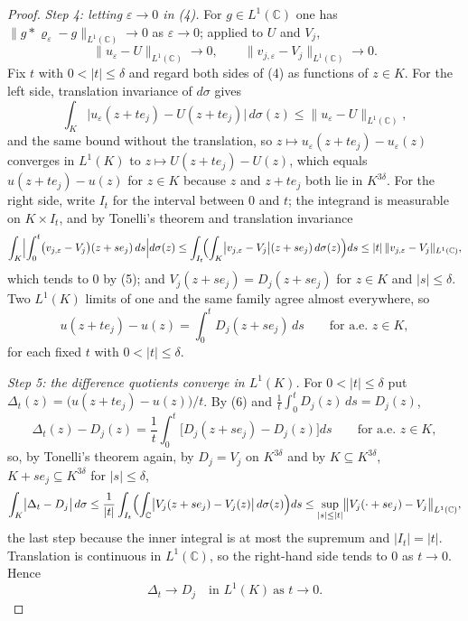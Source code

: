 \begin{proof}
\emph{Step 4: letting $\varepsilon\to0$ in (4).}  For $g\in L^{1}(\mathbb{C})$
one has $\|g*\varrho_\varepsilon-g\|_{L^{1}(\mathbb{C})}\to0$ as
$\varepsilon\to0$; applied to $U$ and $V_j$,
\begin{equation}\tag{5}
  \|u_\varepsilon-U\|_{L^{1}(\mathbb{C})}\to0,\qquad
  \|v_{j,\varepsilon}-V_j\|_{L^{1}(\mathbb{C})}\to0 .
\end{equation}
Fix $t$ with $0<|t|\le\delta$ and regard both sides of (4) as functions of
$z\in K$.  For the left side, translation invariance of $d\sigma$ gives
\[
  \int_K\bigl|u_\varepsilon(z+te_j)-U(z+te_j)\bigr|\,d\sigma(z)
  \le\|u_\varepsilon-U\|_{L^{1}(\mathbb{C})},
\]
and the same bound without the translation, so
$z\mapsto u_\varepsilon(z+te_j)-u_\varepsilon(z)$ converges in $L^{1}(K)$ to
$z\mapsto U(z+te_j)-U(z)$, which equals $u(z+te_j)-u(z)$ for $z\in K$ because
$z$ and $z+te_j$ both lie in $K^{3\delta}$.  For the right side, write $I_t$
for the interval between $0$ and $t$; the integrand is measurable on
$K\times I_t$, and by Tonelli's theorem and translation invariance
\[
  \int_K\Bigl|\int_0^t\bigl(v_{j,\varepsilon}-V_j\bigr)(z+se_j)\,ds\Bigr|
    d\sigma(z)
  \le\int_{I_t}\!\Bigl(\int_K\bigl|v_{j,\varepsilon}-V_j\bigr|(z+se_j)
    \,d\sigma(z)\Bigr)ds
  \le|t|\,\|v_{j,\varepsilon}-V_j\|_{L^{1}(\mathbb{C})},
\]
which tends to $0$ by (5); and $V_j(z+se_j)=D_j(z+se_j)$ for $z\in K$ and
$|s|\le\delta$.  Two $L^{1}(K)$ limits of one and the same family agree almost
everywhere, so
\begin{equation}\tag{6}
  u(z+te_j)-u(z)=\int_0^tD_j(z+se_j)\,ds
  \qquad\text{for a.e. }z\in K,
\end{equation}
for each fixed $t$ with $0<|t|\le\delta$.

\emph{Step 5: the difference quotients converge in $L^{1}(K)$.}  For
$0<|t|\le\delta$ put $\Delta_t(z)=\bigl(u(z+te_j)-u(z)\bigr)/t$.  By (6) and
$\frac1t\int_0^t D_j(z)\,ds=D_j(z)$,
\[
  \Delta_t(z)-D_j(z)=\frac1t\int_0^t\bigl[D_j(z+se_j)-D_j(z)\bigr]ds
  \qquad\text{for a.e. }z\in K,
\]
so, by Tonelli's theorem again, by $D_j=V_j$ on $K^{3\delta}$ and by
$K\subseteq K^{3\delta}$, $K+se_j\subseteq K^{3\delta}$ for $|s|\le\delta$,
\[
  \int_K\bigl|\Delta_t-D_j\bigr|\,d\sigma
  \le\frac1{|t|}\int_{I_t}\Bigl(\int_{\mathbb{C}}
      \bigl|V_j(z+se_j)-V_j(z)\bigr|\,d\sigma(z)\Bigr)ds
  \le\sup_{|s|\le|t|}\bigl\|V_j(\cdot+se_j)-V_j\bigr\|_{L^{1}(\mathbb{C})} ,
\]
the last step because the inner integral is at most the supremum and
$|I_t|=|t|$.
Translation is continuous in $L^{1}(\mathbb{C})$, so the right-hand side tends
to $0$ as $t\to0$.  Hence
\begin{equation}\tag{7}
  \Delta_t\to D_j\quad\text{in }L^{1}(K)\ \text{as }t\to0 .
\end{equation}


\end{proof}
